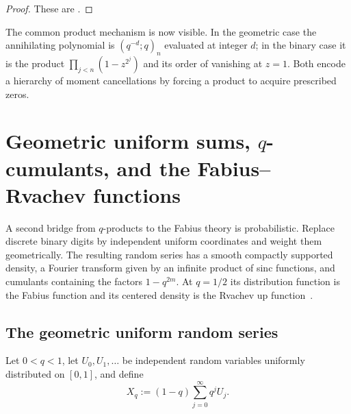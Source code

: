 \documentclass[11pt,oneside,openany]{book}
\theoremstyle{definition}
\theoremstyle{remark}
\begin{document}
\begin{proof}
These are .
\end{proof}

The common product mechanism is now visible.  In the geometric case the annihilating polynomial is $(q^{-d};q)_n$ evaluated at integer $d$; in the binary case it is the product $\prod_{j<n}(1-z^{2^j})$ and its order of vanishing at $z=1$.  Both encode a hierarchy of moment cancellations by forcing a product to acquire prescribed zeros.

\chapter{Geometric uniform sums, \texorpdfstring{$q$}{q}-cumulants, and the Fabius--Rvachev functions}\label{chap:geometric-uniform-fabius}

A second bridge from $q$-products to the Fabius theory is probabilistic.  Replace discrete binary digits by independent uniform coordinates and weight them geometrically.  The resulting random series has a smooth compactly supported density, a Fourier transform given by an infinite product of sinc functions, and cumulants containing the factors $1-q^{2m}$.  At $q=1/2$ its distribution function is the Fabius function and its centered density is the Rvachev up function~\cite{Fabius1966,Rvachev1990,AriasDeReyna1982,ReshetnikovProveIt2026}.

\section{The geometric uniform random series}

Let $0<q<1$, let $U_0,U_1,\ldots$ be independent random variables uniformly distributed on $[0,1]$, and define
\begin{equation}\label{eq:geometric-uniform-series}
 X_q:=(1-q)\sum_{j=0}^{\infty}q^jU_j.
\end{equation}
\end{document}
